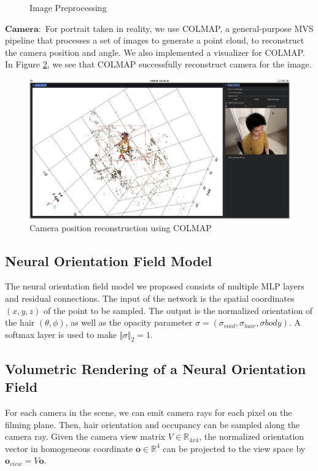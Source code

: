 \documentclass[12pt]{article}
\begin{document}
\begin{figure}[h]
        \caption{Image Preprocessing}
        \label{fig:image_prep}
    \end{figure}

    $\mathbf{Camera:}$ For portrait taken in reality, we use COLMAP, a general-purpose MVS pipeline that processes a set of images to generate a point cloud, to reconstruct the camera position and angle. We also implemented a visualizer for COLMAP. In Figure \ref{fig:colmap_demo}, we see that COLMAP successfully reconstruct camera for the image.
    \begin{figure}[h]
        \centering
        \includegraphics[width=0.5\linewidth]{project-milestone/images/colmap_demo.png}
        \caption{Camera position reconstruction using COLMAP}
        \label{fig:colmap_demo}
    \end{figure}

    \subsection{Neural Orientation Field Model}
    
    The neural orientation field model we proposed consists of multiple MLP layers and residual connections. The input of the network is the spatial coordinates $(x, y, z)$ of the point to be sampled. The output is the normalized orientation of the hair $(\theta, \phi)$, as well as the opacity parameter $\sigma = (\sigma_{void}, \sigma_{hair}, \sigma{body})$. A softmax layer is used to make $\Vert \sigma \Vert_{2} = 1$.

    \subsection{Volumetric Rendering of a Neural Orientation Field}

    For each camera in the scene, we can emit camera rays for each pixel on the filming plane. Then, hair orientation and occupancy can be sampled along the camera ray. Given the camera view matrix $V \in \mathbb{R}_{4x4}$, the normalized orientation vector in homogeneous coordinate $\mathbf{o} \in \mathbb{R}^{4}$ can be projected to the view space by $\mathbf{o}_{view} = V\mathbf{o}$.
\end{document}
